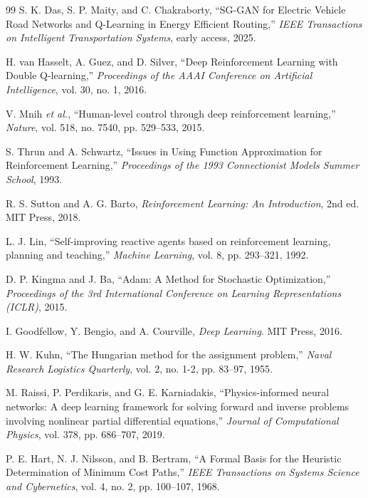 \documentclass{article}
\begin{document}
\begin{thebibliography}{99}
S. K. Das, S. P. Maity, and C. Chakraborty, ``SG-GAN for Electric Vehicle Road Networks and Q-Learning in Energy Efficient Routing,'' \textit{IEEE Transactions on Intelligent Transportation Systems}, early access, 2025.

H. van Hasselt, A. Guez, and D. Silver, ``Deep Reinforcement Learning with Double Q-learning,'' \textit{Proceedings of the AAAI Conference on Artificial Intelligence}, vol. 30, no. 1, 2016.

V. Mnih \textit{et al.}, ``Human-level control through deep reinforcement learning,'' \textit{Nature}, vol. 518, no. 7540, pp. 529--533, 2015.

S. Thrun and A. Schwartz, ``Issues in Using Function Approximation for Reinforcement Learning,'' \textit{Proceedings of the 1993 Connectionist Models Summer School}, 1993.

R. S. Sutton and A. G. Barto, \textit{Reinforcement Learning: An Introduction}, 2nd ed. MIT Press, 2018.

L. J. Lin, ``Self-improving reactive agents based on reinforcement learning, planning and teaching,'' \textit{Machine Learning}, vol. 8, pp. 293--321, 1992.

D. P. Kingma and J. Ba, ``Adam: A Method for Stochastic Optimization,'' \textit{Proceedings of the 3rd International Conference on Learning Representations (ICLR)}, 2015.

I. Goodfellow, Y. Bengio, and A. Courville, \textit{Deep Learning}. MIT Press, 2016.

H. W. Kuhn, ``The Hungarian method for the assignment problem,'' \textit{Naval Research Logistics Quarterly}, vol. 2, no. 1-2, pp. 83--97, 1955.

M. Raissi, P. Perdikaris, and G. E. Karniadakis, ``Physics-informed neural networks: A deep learning framework for solving forward and inverse problems involving nonlinear partial differential equations,'' \textit{Journal of Computational Physics}, vol. 378, pp. 686--707, 2019.

P. E. Hart, N. J. Nilsson, and B. Bertram, ``A Formal Basis for the Heuristic Determination of Minimum Cost Paths,'' \textit{IEEE Transactions on Systems Science and Cybernetics}, vol. 4, no. 2, pp. 100--107, 1968.


\end{thebibliography}
\end{document}
